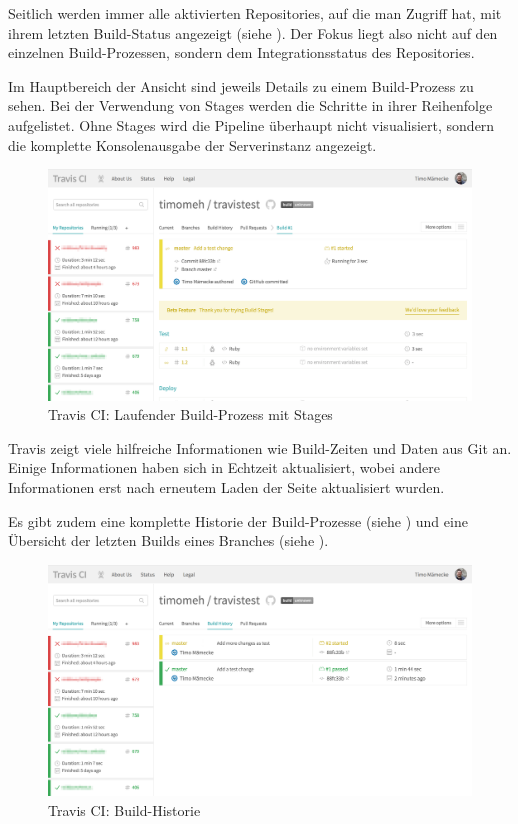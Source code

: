 Seitlich werden immer alle aktivierten Repositories, auf die man Zugriff hat, mit ihrem letzten Build-Status angezeigt (siehe ). Der Fokus liegt also nicht auf den einzelnen Build-Prozessen, sondern dem Integrationsstatus des Repositories.

Im Hauptbereich der Ansicht sind jeweils Details zu einem Build-Prozess zu sehen. Bei der Verwendung von Stages werden die Schritte in ihrer Reihenfolge aufgelistet. Ohne Stages wird die Pipeline überhaupt nicht visualisiert, sondern die komplette Konsolenausgabe der Serverinstanz angezeigt.

\begin{figure}[h]
  \caption{Travis CI: Laufender Build-Prozess mit Stages}
  \label{fig:travis-running-build}
  \includegraphics[width=.8\textwidth]{assets/travis-running-build}
\end{figure}

Travis zeigt viele hilfreiche Informationen wie Build-Zeiten und Daten aus Git an. Einige Informationen haben sich in Echtzeit aktualisiert, wobei andere Informationen erst nach erneutem Laden der Seite aktualisiert wurden.

Es gibt zudem eine komplette Historie der Build-Prozesse (siehe ) und eine Übersicht der letzten Builds eines Branches (siehe ).

\begin{figure}[h]
  \caption{Travis CI: Build-Historie}
  \label{fig:travis-history}
  \includegraphics[width=.8\textwidth]{assets/travis-history}
\end{figure}

